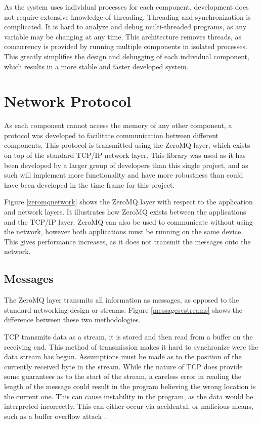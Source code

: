 As the system uses individual processes for each component, development does not require extensive knowledge of threading. Threading and synchronization is complicated. It is hard to analyze and debug multi-threaded programs, as any variable may be changing at any time. This architecture removes threads, as concurrency is provided by running multiple components in isolated processes. This greatly simplifies the design and debugging of each individual component, which results in a more stable and faster developed system.

\section{Network Protocol}

As each component cannot access the memory of any other component, a protocol was developed to facilitate communication between different components. This protocol is transmitted using the ZeroMQ layer, which exists on top of the standard TCP/IP network layer. This library was used as it has been developed by a larger group of developers than this single project, and as such will implement more functionality and have more robustness than could have been developed in the time-frame for this project.


Figure \ref{zeromqnetwork} shows the ZeroMQ layer with respect to the application and network layers. It illustrates how ZeroMQ exists between the applications and the TCP/IP layer. ZeroMQ can also be used to communicate without using the network, however both applications must be running on the same device. This gives performance increases, as it does not transmit the messages onto the network.

\subsection{Messages}

The ZeroMQ layer transmits all information as messages, as opposed to the standard networking design or streams. Figure \ref{messagesvstreams} shows the difference between these two methodologies.


TCP transmits data as a stream, it is stored and then read from a buffer on the receiving end. This method of transmission makes it hard to synchronize were the data stream has begun. Assumptions must be made as to the position of the currently received byte in the stream. While the nature of TCP does provide some  guarantees as to the start of the stream, a careless error in reading the length of the message could result in the program believing the wrong location is the current one. This can cause instability in the program, as the data would be interpreted incorrectly. This can either occur via accidental, or malicious means, such as a buffer overflow attack \cite{bufferoverflow}. 

